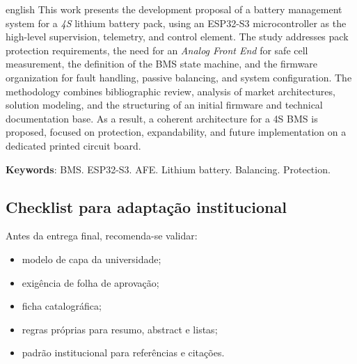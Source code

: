 \documentclass[
  12pt,
  oneside,
  openright,
  a4paper,
  english,
  brazil
]{abntex2}
\begin{document}
\begin{resumo}[Abstract]
\begin{otherlanguage*}{english}
This work presents the development proposal of a battery management system for a \textit{4S}
lithium battery pack, using an ESP32-S3 microcontroller as the high-level supervision, telemetry,
and control element. The study addresses pack protection requirements, the need for an
\textit{Analog Front End} for safe cell measurement, the definition of the BMS state machine,
and the firmware organization for fault handling, passive balancing, and system configuration.
The methodology combines bibliographic review, analysis of market architectures, solution modeling,
and the structuring of an initial firmware and technical documentation base. As a result, a
coherent architecture for a 4S BMS is proposed, focused on protection, expandability, and future
implementation on a dedicated printed circuit board.

\textbf{Keywords}: BMS. ESP32-S3. AFE. Lithium battery. Balancing. Protection.
\end{otherlanguage*}
\end{resumo}

\tableofcontents*
\cleardoublepage

\textual









\postextual



\begin{apendicesenv}
\partapendices
\chapter{Checklist para adaptação institucional}

Antes da entrega final, recomenda-se validar:

\begin{itemize}
  \item modelo de capa da universidade;
  \item exigência de folha de aprovação;
  \item ficha catalográfica;
  \item regras próprias para resumo, abstract e listas;
  \item padrão institucional para referências e citações.
\end{itemize}
\end{apendicesenv}
\end{document}
